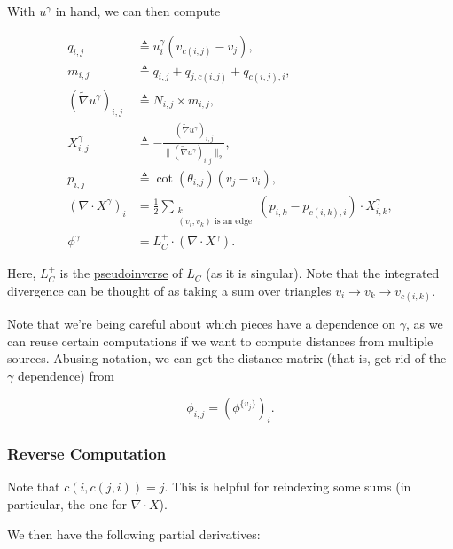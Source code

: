 With $u^\gamma$ in hand, we can then compute

$$\begin{aligned}
	q_{i, j} &\triangleq u^\gamma_i(v_{c(i, j)} - v_j), \\
	m_{i, j} &\triangleq q_{i, j} + q_{j, c(i, j)} + q_{c(i, j), i}, \\
	(\widetilde{\nabla} u^\gamma)_{i, j} &\triangleq N_{i, j} \times m_{i, j}, \\
	X^\gamma_{i, j} &\triangleq -\frac{(\widetilde{\nabla} u^\gamma)_{i, j}}{\|(\widetilde{\nabla} u^\gamma)_{i, j}\|_2}, \\
	p_{i, j} &\triangleq \cot(\theta_{i, j})(v_j - v_i), \\
	(\nabla \cdot X^\gamma)_i &= \frac{1}{2}\sum_{\substack{k \\ \text{$(v_i, v_k)$ is an edge}}}(p_{i, k} - p_{c(i, k), i}) \cdot X^\gamma_{i, k}, \\
	\phi^\gamma &= L_C^+ \cdot (\nabla \cdot X^\gamma).
\end{aligned}$$

Here, $L_C^+$ is the \href{https://en.wikipedia.org/wiki/Moore%E2%80%93Penrose_inverse}{pseudoinverse} of $L_C$ (as it is singular). Note that the integrated divergence can be thought of as taking a sum over triangles $v_i \to v_k \to v_{c(i, k)}$.

Note that we're being careful about which pieces have a dependence on $\gamma$, as we can reuse certain computations if we want to compute distances from multiple sources. Abusing notation, we can get the distance matrix (that is, get rid of the $\gamma$ dependence) from

$$\phi_{i, j} = \left(\phi^{\{v_j\}}\right)_i.$$

\subsubsection{Reverse Computation}

Note that $c(i, c(j, i)) = j$. This is helpful for reindexing some sums (in particular, the one for $\nabla \cdot X$).

We then have the following partial derivatives:

